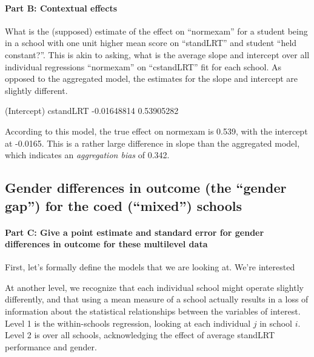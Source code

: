 \documentclass{article}
\begin{document}
\paragraph{Part B: Contextual effects }  What is the (supposed) estimate of the effect on ``normexam'' for a student being in a school with one unit higher mean score on ``standLRT'' and student ``held constant?''.  This is akin to asking, what is the average slope and intercept over all individual regressions ``normexam'' on ``cstandLRT'' fit for each school.  As opposed to the aggregated model, the estimates for the slope and intercept are slightly different.  

\begin{Schunk}
\begin{Soutput}
(Intercept)   cstandLRT 
-0.01648814  0.53905282 
\end{Soutput}
\end{Schunk}

According to this model, the true effect on normexam is 0.539, with the intercept at -0.0165.  This is a rather large difference in slope than the aggregated model, which indicates an \emph{aggregation bias} of  0.342.

\subsection{Gender differences in outcome (the ``gender gap'') for the coed (``mixed'') schools}

\paragraph{\textbf{Part C: } Give a point estimate and standard error for gender differences in outcome for these multilevel data}

First, let's formally define the models that we are looking at.  We're interested 

At another level, we recognize that each individual school might operate slightly differently, and that using a mean measure of a school actually results in a loss of information about the statistical relationships between the variables of interest.  Level 1 is the within-schools regression, looking at each individual $j$ in school $i$.  Level 2 is over all schools, acknowledging the effect of average standLRT performance and gender.
\end{document}
